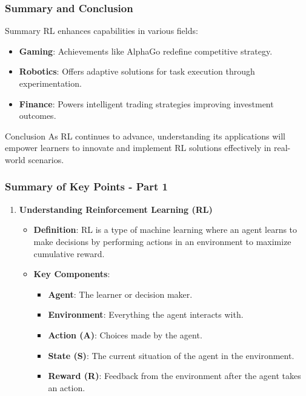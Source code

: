 \documentclass{beamer}
\begin{document}
\begin{frame}[fragile]
    \frametitle{Summary and Conclusion}
    \begin{block}{Summary}
        RL enhances capabilities in various fields:
        \begin{itemize}
            \item \textbf{Gaming}: Achievements like AlphaGo redefine competitive strategy.
            \item \textbf{Robotics}: Offers adaptive solutions for task execution through experimentation.
            \item \textbf{Finance}: Powers intelligent trading strategies improving investment outcomes.
        \end{itemize}
    \end{block}
    
    \begin{block}{Conclusion}
        As RL continues to advance, understanding its applications will empower learners to innovate and implement RL solutions effectively in real-world scenarios.
    \end{block}
\end{frame}

\begin{frame}[fragile]
    \frametitle{Summary of Key Points - Part 1}
    \begin{enumerate}
        \item \textbf{Understanding Reinforcement Learning (RL)}
        \begin{itemize}
            \item \textbf{Definition}: RL is a type of machine learning where an agent learns to make decisions by performing actions in an environment to maximize cumulative reward.
            \item \textbf{Key Components}:
            \begin{itemize}
                \item \textbf{Agent}: The learner or decision maker.
                \item \textbf{Environment}: Everything the agent interacts with.
                \item \textbf{Action (A)}: Choices made by the agent.
                \item \textbf{State (S)}: The current situation of the agent in the environment.
                \item \textbf{Reward (R)}: Feedback from the environment after the agent takes an action.
            \end{itemize}
        \end{itemize}
    \end{enumerate}
\end{frame}
\end{document}
